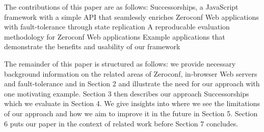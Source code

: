 The contributions of this paper are as follows:
Successorships, a JavaScript framework with a simple API that seamlessly enriches Zeroconf Web applications with fault-tolerance through state replication
A reproducable evaluation methodology for Zeroconf Web applications
Example applications that demonstrate the benefits and usability of our framework

The remainder of this paper is structured as follows: we provide necessary background information on the related areas of Zeroconf, in-browser Web servers and fault-tolerance and in Section 2 and illustrate the need for our approach with one motivating example.
Section 3 then describes our approach Successorships which we evaluate in Section 4.
We give insights into where we see the limitations of our approach and how we aim to improve it in the future in Section 5.
Section 6 puts our paper in the context of related work before Section 7 concludes.
